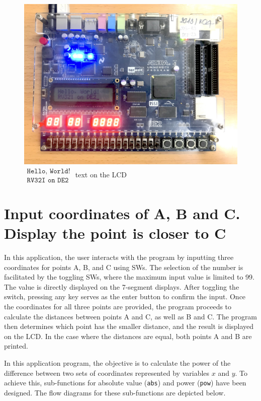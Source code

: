 \documentclass[12pt,a4paper,oneside]{book} %
\begin{document}
\begin{figure}[H]
    \centering
    \includegraphics[width=.80\textwidth]{images/helloworld.jpg}
    \caption{$
    \begin{array}{l}
        \texttt{Hello, World!}\\
        \texttt{RV32I on DE2}
    \end{array}
    $ text on the LCD}
\end{figure}

\section{Input coordinates of A, B and C. Display the point is closer to C}
In this application, the user interacts with the program by inputting three coordinates for points A, B, and C using SWs. The selection of the number is facilitated by the toggling SWs, where the maximum input value is limited to 99. The value is directly displayed on the 7-segment displays. After toggling the switch, pressing any key serves as the enter button to confirm the input. Once the coordinates for all three points are provided, the program proceeds to calculate the distances between points A and C, as well as B and C. The program then determines which point has the smaller distance, and the result is displayed on the LCD. In the case where the distances are equal, both points A and B are printed.

In this application program, the objective is to calculate the power of the difference between two sets of coordinates represented by variables $x$ and $y$. To achieve this, sub-functions for absolute value (\texttt{abs}) and power (\texttt{pow}) have been designed. The flow diagrams for these sub-functions are depicted below. 
\end{document}
